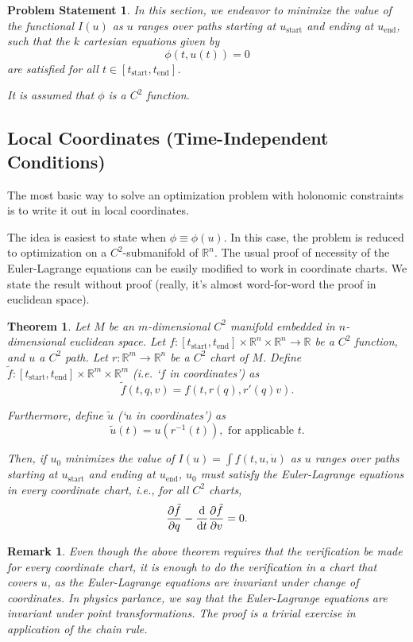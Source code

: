 \documentclass{article}
\newtheorem{theorem}{Theorem}
\theoremstyle{plain}
\newtheorem{remark}{Remark}
\theoremstyle{nonumberplain}
\newtheorem{statement}{Problem Statement}
\newcommand{\R}{\mathbb{R}}
\newcommand{\tstart}{\mathrm{start}}
\newcommand{\tend}{\mathrm{end}}
\begin{document}
\begin{statement}
In this section, we endeavor to minimize the value of the functional $I(u)$ as $u$ ranges over paths starting at $u_\tstart$ and ending at $u_\tend$, such that the $k$ cartesian equations given by
\[\phi(t, u(t)) = 0\]
are satisfied for all $t \in [t_\tstart, t_\tend]$.

It is assumed that $\phi$ is a $C^2$ function.
\end{statement}

\subsection{Local Coordinates (Time-Independent Conditions)}

The most basic way to solve an optimization problem with holonomic constraints is to write it out in local coordinates.

The idea is easiest to state when $\phi \equiv \phi(u)$. In this case, the problem is reduced to optimization on a $C^2$-submanifold of $\R^n$. The usual proof of necessity of the Euler-Lagrange equations can be easily modified to work in coordinate charts. We state the result without proof (really, it's almost word-for-word the proof in euclidean space).

\begin{theorem}\label{elinmanifolds}
Let $M$ be an $m$-dimensional $C^2$ manifold embedded in $n$-dimensional euclidean space. Let $f : [t_\tstart, t_\tend] \times \R^n \times \R^n \to \R$ be a $C^2$ function, and $u$ a $C^2$ path. Let $r : \R^m \to \R^n$ be a $C^2$ chart of $M$. Define $\tilde f : [t_\tstart, t_\tend] \times \R^m \times \R^m$ (i.e. `$f$ in coordinates') as
\[ \tilde f(t, q, v) = f(t, r(q), r'(q)v).\]

Furthermore, define $\tilde u$ (`$u$ in coordinates') as
\[\tilde u(t) = u(r^{-1}(t)), \text{ for applicable $t$.}\]

Then, if $u_0$ minimizes the value of $I(u) = \int f(t,u,\dot u)$ as $u$ ranges over paths starting at $u_\tstart$ and ending at $u_\tend$, $u_0$ must satisfy the Euler-Lagrange equations in every coordinate chart, i.e., for all $C^2$ charts,
\[\diffp{\tilde f} q - \diff*{\diffp{\tilde f}v}t = 0.\]
\end{theorem}

\begin{remark}
Even though the above theorem requires that the verification be made for every coordinate chart, it is enough to do the verification in a chart that covers $u$, as the Euler-Lagrange equations are invariant under change of coordinates. In physics parlance, we say that the Euler-Lagrange equations are invariant under point transformations. The proof is a trivial exercise in application of the chain rule.
\end{remark}
\end{document}

